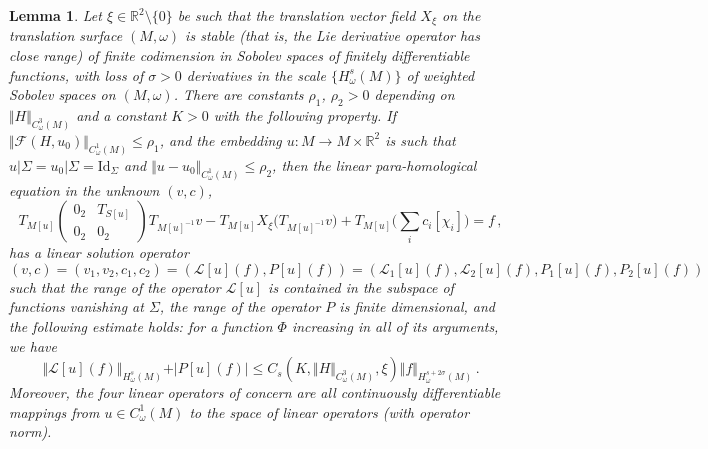 \documentclass[11pt]{amsart}
\newcommand \R {{ \mathbb R}}
\newtheorem {lemma} [theorem]{Lemma}
\begin{document}
\begin{lemma}  
\label{lemma:solutions}
Let $\xi \in \R^2 \setminus \{0\}$ be such that the translation vector field $X_\xi$ on the translation surface $(M, \omega)$ is stable
(that is, the Lie derivative operator has close range) of finite codimension in Sobolev spaces of finitely differentiable functions, with loss of $\sigma>0$
derivatives in the scale $\{H^s_\omega(M) \}$ of weighted Sobolev spaces on $(M, \omega)$.
There are constants $\rho_1$, $\rho_2>0$ depending on $\Vert H \Vert_{C^3_\omega(M)}$  and a constant $K>0$ with the following property. If  $\Vert \mathcal F (H, u_0)\Vert_{C^1_\omega(M)} \leq \rho_1$, and the embedding $u: M \to M \times \R^2$  is such that $u\vert \Sigma = u_0 \vert \Sigma= \text{Id}_\Sigma$ and $\Vert u- u_0\Vert_{C^1_\omega(M)} \leq \rho_2$, then the linear para-homological equation in the unknown $(v, c)$,
$$
T_{M[u]} \begin{pmatrix} 0_2 & T_{S[u]} \\ 0_2 & 0_2 \end{pmatrix} T_{M[u]^{-1}}  v - 
T_{ M[u] } X_\xi \Big(T_{M[u]^{-1} }  v \Big)  + T_{M[u]}\Big( \sum_i  c_i [\chi_i] \Big) = f \,,
$$
has a linear solution operator 
$$
(v, c) = (v_1, v_2, c_1, c_2) =  (\mathcal L[u] (f),  P[u] (f)) =(\mathcal L_1[u] (f), \mathcal L_2[u] (f),  P_1[u] (f), P_2[u] (f) )
$$
such that the range of the operator  $\mathcal L[u]$ is contained in the subspace of functions vanishing at $\Sigma$, the range of the operator $P$
is finite dimensional, and the following estimate holds: for a function $\Phi$ increasing in all of its arguments, we have
$$
\Vert \mathcal L [u] (f) \Vert_{H^s_\omega(M)} + \vert P[u] (f) \vert \leq  C_s (K, \Vert H\Vert_{C^3_\omega(M)}, \xi) \Vert  f \Vert_{H^{s+2\sigma}_\omega(M)} \,.
$$
Moreover, the four linear operators of concern are all continuously differentiable mappings from $u\in C^1_\omega(M)$ to the space of linear operators (with operator norm). 
\end{lemma} 
\end{document}
